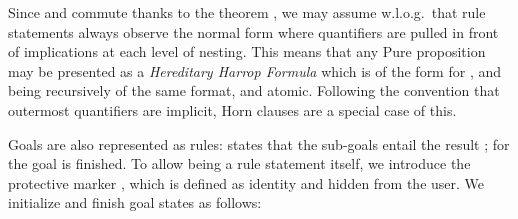 \begin{isabellebody}
\begin{isamarkuptext}
  Since \isa{{\isachardoublequote}{\isasymAnd}{\isachardoublequote}} and \isa{{\isachardoublequote}{\isasymLongrightarrow}{\isachardoublequote}} commute thanks to the theorem
  , we may assume w.l.o.g.\
  that rule statements always observe the normal form where
  quantifiers are pulled in front of implications at each level of
  nesting.  This means that any Pure proposition may be presented as a
  \emph{Hereditary Harrop Formula} \cite{Miller:1991} which is of the
  form  for , and 
  being recursively of the same format, and \isa{{\isachardoublequote}A{\isachardoublequote}} atomic.
  Following the convention that outermost quantifiers are implicit,
  Horn clauses  are a special
  case of this.

  \medskip Goals are also represented as rules:  states that the sub-goals  entail the result ; for  the
  goal is finished.  To allow \isa{{\isachardoublequote}C{\isachardoublequote}} being a rule statement
  itself, we introduce the protective marker , which is defined as identity and hidden from the user.  We
  initialize and finish goal states as follows:


\end{isamarkuptext}
\end{isabellebody}
